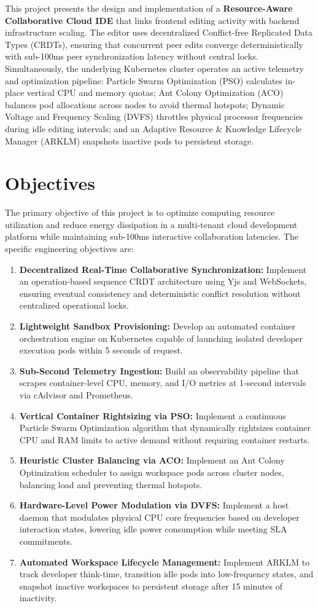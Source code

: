 \documentclass[12pt,a4paper]{report}
\begin{document}
	This project presents the design and implementation of a \textbf{Resource-Aware Collaborative Cloud IDE} that links frontend editing activity with backend infrastructure scaling. The editor uses decentralized Conflict-free Replicated Data Types (CRDTs), ensuring that concurrent peer edits converge deterministically with sub-100ms peer synchronization latency without central locks. Simultaneously, the underlying Kubernetes cluster operates an active telemetry and optimization pipeline: Particle Swarm Optimization (PSO) calculates in-place vertical CPU and memory quotas; Ant Colony Optimization (ACO) balances pod allocations across nodes to avoid thermal hotspots; Dynamic Voltage and Frequency Scaling (DVFS) throttles physical processor frequencies during idle editing intervals; and an Adaptive Resource \& Knowledge Lifecycle Manager (ARKLM) snapshots inactive pods to persistent storage.
	
	\section{Objectives}
	The primary objective of this project is to optimize computing resource utilization and reduce energy dissipation in a multi-tenant cloud development platform while maintaining sub-100ms interactive collaboration latencies. The specific engineering objectives are:
	\begin{enumerate}
		\item \textbf{Decentralized Real-Time Collaborative Synchronization:} Implement an operation-based sequence CRDT architecture using Yjs and WebSockets, ensuring eventual consistency and deterministic conflict resolution without centralized operational locks.
		\item \textbf{Lightweight Sandbox Provisioning:} Develop an automated container orchestration engine on Kubernetes capable of launching isolated developer execution pods within 5 seconds of request.
		\item \textbf{Sub-Second Telemetry Ingestion:} Build an observability pipeline that scrapes container-level CPU, memory, and I/O metrics at 1-second intervals via cAdvisor and Prometheus.
		\item \textbf{Vertical Container Rightsizing via PSO:} Implement a continuous Particle Swarm Optimization algorithm that dynamically rightsizes container CPU and RAM limits to active demand without requiring container restarts.
		\item \textbf{Heuristic Cluster Balancing via ACO:} Implement an Ant Colony Optimization scheduler to assign workspace pods across cluster nodes, balancing load and preventing thermal hotspots.
		\item \textbf{Hardware-Level Power Modulation via DVFS:} Implement a host daemon that modulates physical CPU core frequencies based on developer interaction states, lowering idle power consumption while meeting SLA commitments.
		\item \textbf{Automated Workspace Lifecycle Management:} Implement ARKLM to track developer think-time, transition idle pods into low-frequency states, and snapshot inactive workspaces to persistent storage after 15 minutes of inactivity.
	\end{enumerate}
	
\end{document}
